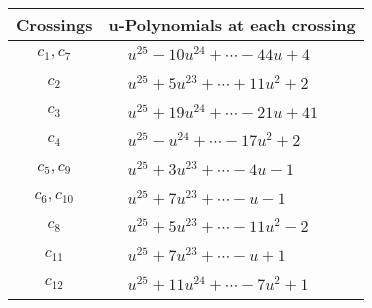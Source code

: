 \documentclass[1p]{elsarticle_modified}
\theoremstyle{definition}
\begin{document}
\begin{tabular}{m{50pt}|m{274pt}}
Crossings & \hspace{64pt}u-Polynomials at each crossing \\
\hline $$\begin{aligned}c_{1},c_{7}\end{aligned}$$&$\begin{aligned}
&u^{25}-10 u^{24}+\cdots-44 u+4
\end{aligned}$\\
\hline $$\begin{aligned}c_{2}\end{aligned}$$&$\begin{aligned}
&u^{25}+5 u^{23}+\cdots+11 u^2+2
\end{aligned}$\\
\hline $$\begin{aligned}c_{3}\end{aligned}$$&$\begin{aligned}
&u^{25}+19 u^{24}+\cdots-21 u+41
\end{aligned}$\\
\hline $$\begin{aligned}c_{4}\end{aligned}$$&$\begin{aligned}
&u^{25}- u^{24}+\cdots-17 u^2+2
\end{aligned}$\\
\hline $$\begin{aligned}c_{5},c_{9}\end{aligned}$$&$\begin{aligned}
&u^{25}+3 u^{23}+\cdots-4 u-1
\end{aligned}$\\
\hline $$\begin{aligned}c_{6},c_{10}\end{aligned}$$&$\begin{aligned}
&u^{25}+7 u^{23}+\cdots- u-1
\end{aligned}$\\
\hline $$\begin{aligned}c_{8}\end{aligned}$$&$\begin{aligned}
&u^{25}+5 u^{23}+\cdots-11 u^2-2
\end{aligned}$\\
\hline $$\begin{aligned}c_{11}\end{aligned}$$&$\begin{aligned}
&u^{25}+7 u^{23}+\cdots- u+1
\end{aligned}$\\
\hline $$\begin{aligned}c_{12}\end{aligned}$$&$\begin{aligned}
&u^{25}+11 u^{24}+\cdots-7 u^2+1
\end{aligned}$\\
\hline
\end{tabular}\\~\\
\end{document}
